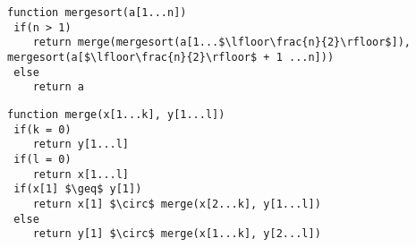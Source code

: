 \documentclass[a4paper]{article}
\begin{document}

\begin{tcolorbox}[colback=blue!20!white,colframe=purple!60!white,title=\textbf{Merge Sort}]
\begin{lstlisting}[mathescape]
function mergesort(a[1...n])
 if(n > 1)
 	return merge(mergesort(a[1...$\lfloor\frac{n}{2}\rfloor$]), mergesort(a[$\lfloor\frac{n}{2}\rfloor$ + 1 ...n]))
 else
 	return a
\end{lstlisting}
\lstset{
firstnumber=6
}
\begin{lstlisting}[mathescape]
function merge(x[1...k], y[1...l])
 if(k = 0)
 	return y[1...l]
 if(l = 0)
 	return x[1...l]
 if(x[1] $\geq$ y[1])
 	return x[1] $\circ$ merge(x[2...k], y[1...l])
 else
 	return y[1] $\circ$ merge(x[1...k], y[2...l])
\end{lstlisting}
\end{tcolorbox}
\end{document}
